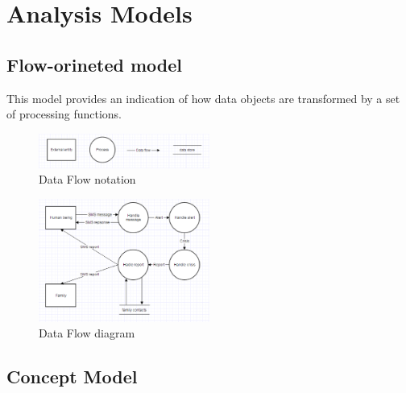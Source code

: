 \chapter{Analysis Models}
\label{chap:AM}



\section{Flow-orineted model}
This model provides an indication of how data objects are transformed by a set
of processing functions.

\begin{figure}[h]
	\centering	
	\captionsetup{justification=centering}
	\includegraphics[width=0.5\textwidth]{./images/flow_notation.eps}
	\caption{Data Flow notation}
\end{figure}


\begin{figure}[h]
	\centering
	\captionsetup{justification=centering}
	\includegraphics[width=0.5\textwidth]{./images/data_flow_diagram.eps}
	\caption{Data Flow diagram}
\end{figure} 



\section{Concept Model}
 

